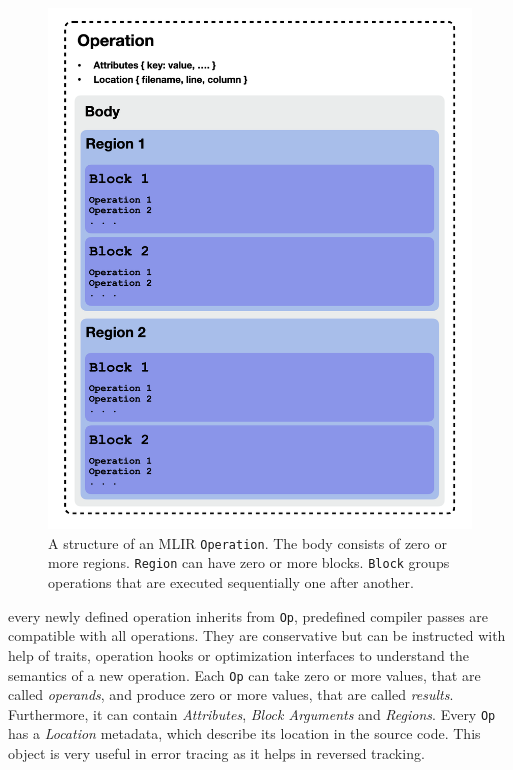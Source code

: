 \documentclass[sigplan,\review anonymous]{acmart}
\begin{document}
\begin{figure}
  \centering
  \includegraphics[width=\columnwidth]{images/operation_struct.png}
  \caption{A structure of an MLIR \texttt{Operation}. The body consists
  of zero or more regions. \texttt{Region} can have zero or more blocks.
  \texttt{Block} groups operations that are executed sequentially one after
  another.}
  \label{fig:operation_struct}
\end{figure}

\noindent every newly defined
operation inherits from \texttt{Op}, predefined compiler passes are compatible
with all operations. They are conservative but can be instructed with help of
traits, operation hooks or optimization interfaces to understand the semantics
of a new operation. Each \texttt{Op} can take zero or more values, that are
called \textit{operands}, and produce zero or more values, that are called
\textit{results}. Furthermore, it can contain \textit{Attributes},
\textit{Block Arguments} and \textit{Regions}. Every \texttt{Op} has a
\textit{Location} metadata, which describe its location in the source code.
This object is very useful in error tracing as it helps in reversed tracking.
\end{document}

